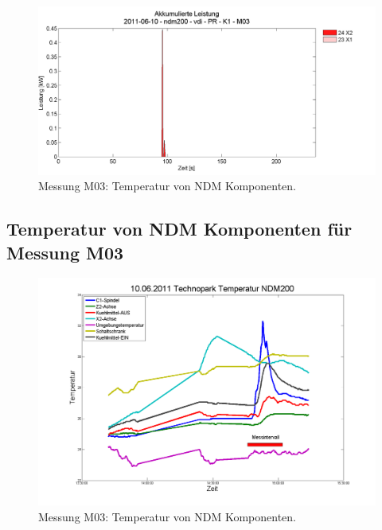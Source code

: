 \documentclass[a4paper,11pt,pdftex,twoside]{scrartcl}
\begin{document}
\begin{figure}[H]
\begin{center}
  \includegraphics[width=\columnwidth]{figures/cnc/2011-06-10_ndm200_vdi_PR_K1_M03_area1.png}
  \caption{Messung M03: Temperatur von NDM Komponenten.}
  \label{fig:M04_area}
\end{center}
\end{figure}



\subsection{Temperatur von NDM Komponenten f\"ur  Messung M03}

\begin{figure}[H]
\begin{center}
  \includegraphics[width=\columnwidth]{figures/TemperaturNDM200.png}
  \caption{Messung M03: Temperatur von NDM Komponenten.}
  \label{fig:M04_area}
\end{center}
\end{figure}
\end{document}
